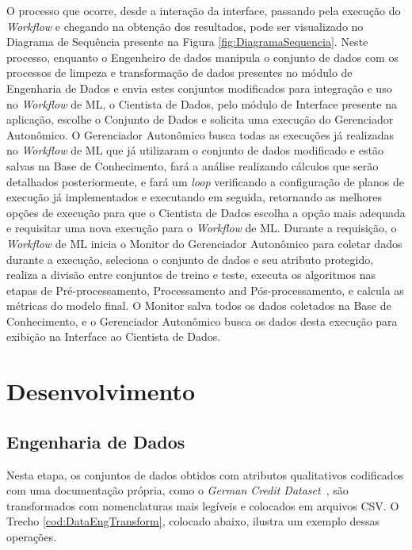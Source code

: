 \documentclass[portugues]{ic-tese}
\begin{document}
O processo que ocorre, desde a interação da interface, passando pela execução do \textit{Workflow} e chegando na obtenção dos resultados, pode ser visualizado no Diagrama de Sequência presente na Figura \ref{fig:DiagramaSequencia}. Neste processo, enquanto o Engenheiro de dados manipula o conjunto de dados com os processos de limpeza e transformação de dados presentes no módulo de Engenharia de Dados e envia estes conjuntos modificados para integração e uso no \textit{Workflow} de ML, o Cientista de Dados, pelo módulo de Interface presente na aplicação, escolhe o Conjunto de Dados e solicita uma execução do Gerenciador Autonômico. O Gerenciador Autonômico busca todas as execuções já realizadas no \textit{Workflow} de ML que já utilizaram o conjunto de dados modificado e estão salvas na Base de Conhecimento, fará a análise realizando cálculos que serão detalhados posteriormente, e fará um \textit{loop} verificando a configuração de planos de execução já implementados e executando em seguida, retornando as melhores opções de execução para que o Cientista de Dados escolha a opção mais adequada e requisitar uma nova execução para o \textit{Workflow} de ML. Durante a requisição, o \textit{Workflow} de ML inicia o Monitor do Gerenciador Autonômico para coletar dados durante a execução, seleciona o conjunto de dados e seu atributo protegido, realiza a divisão entre conjuntos de treino e teste, executa os algoritmos nas etapas de Pré-processamento, Processamento and Pós-processamento, e calcula as métricas do modelo final. O Monitor salva todos os dados coletados na Base de Conhecimento, e o Gerenciador Autonômico busca os dados desta execução para exibição na Interface ao Cientista de Dados.

\section{Desenvolvimento}
\label{sec:Desenvolvimento}

\subsection{Engenharia de Dados}

Nesta etapa, os conjuntos de dados obtidos com atributos qualitativos codificados com uma documentação própria, como o \textit{German Credit Dataset}~\citep{ucigerman_2021}, são transformados com nomenclaturas mais legíveis e colocados em arquivos CSV. O Trecho \ref{cod:DataEngTransform}, colocado abaixo, ilustra um exemplo dessas operações.
\end{document}

